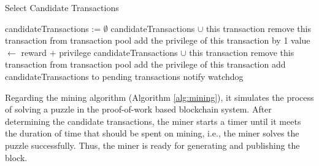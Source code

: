 \clearpage
\vspace*{\fill}
\begin{algorithm}[htb]
    \caption{Select Candidate Transactions}
    \label{alg:select candidate transactions}
\begin{algorithmic}[1]
    \State candidateTransactions := $\emptyset$
    \State
                \State candidateTransactions $\cup$ this transaction
                \State remove this transaction from transaction pool
            \Else
                \State add the privilege of this transaction by 1
            \EndIf
        \EndFor
            \State value $\gets$ reward $+$ privilege
                \State candidateTransactions $\cup$ this transaction
                \State remove this transaction from transaction pool
            \Else
                \State add the privilege of this transaction
            \EndIf
        \EndFor
    \EndIf
    \State
        \State {}
    \Else
        \State add candidateTransactions to pending transactions
    \EndIf
    \State
    \State notify watchdog
    \EndProcedure
\end{algorithmic}
\end{algorithm}
\vspace*{\fill}

\clearpage

\vspace*{\fill}
Regarding the mining algorithm (Algorithm \ref{alg:mining}), it simulates the process of solving a puzzle in the proof-of-work based blockchain system. After determining the candidate transactions, the miner starts a timer until it meets the duration of time that should be spent on mining, i.e., the miner solves the puzzle successfully. Thus, the miner is ready for generating and publishing the block.

